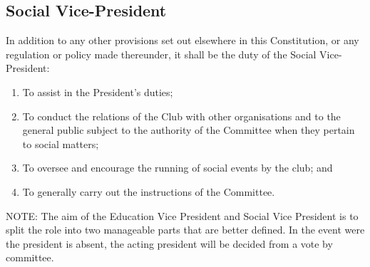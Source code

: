 \documentclass[11pt]{article} %
\begin{document}
{\color{ForestGreen} \subsection{Social Vice-President}
In addition to any other provisions set out elsewhere in this Constitution, or any regulation or policy made thereunder, it shall be the duty of the Social Vice-President:
\begin{enumerate}
	\item To assist in the President's duties;
	\item To conduct the relations of the Club with other organisations and to the general public subject to the authority of the Committee when they pertain to social matters;
	\item To oversee and encourage the running of social events by the club; and
	\item To generally carry out the instructions of the Committee.
\end{enumerate}}

{\color{Cyan}NOTE:
The aim of the Education Vice President and Social Vice President is to split the role into two manageable parts that are better defined.
In the event were the president is absent, the acting president will be decided from a vote by committee.
}
\end{document}
